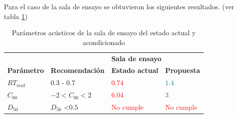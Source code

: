 Para el caso de la sala de ensayo se obtuvieron los siguientes resultados. (ver tabla \ref{tab: resultados sala de ensayo})
\begin{table}[H]
    \centering
    \begin{tabular}{|l|l|ll|}
    \hline
     &  & \multicolumn{2}{l|}{\textbf{Sala de ensayo}} \\ \cline{3-4} 
    \multirow{-2}{*}{\textbf{Parámetro}} & \multirow{-2}{*}{\textbf{Recomendación}} & \multicolumn{1}{l|}{\textbf{Estado actual}} & \textbf{Propuesta} \\ \hline
    $RT_{mid}$ & $0.3$ - $0.7$ & \multicolumn{1}{l|}{\textcolor{red}{$0.74$}} & \textcolor{teal}{$1.4$} \\ \hline
    $C_{80}$ & $-2<C_{80}<2$ & \multicolumn{1}{l|}{\textcolor{red}{$6.04$}} & \textcolor{teal}{$3$} \\ \hline
    $D_{50}$ & $D_{50}$ \textless $0.5$ & \multicolumn{1}{l|}{\textcolor{red}{No cumple}} & \textcolor{red}{No cumple} \\ \hline
    \end{tabular}
    \caption{Parámetros acústicos de la sala de ensayo del estado actual y acondicionado}
    \label{tab: resultados sala de ensayo}
\end{table}